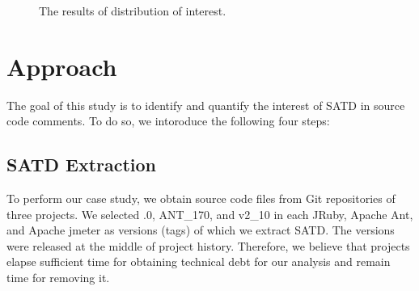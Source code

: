 \begin{figure}[!t]
  \begin{center}

  \caption{The results of distribution of interest.}
  \label{fig:dist}
  \end{center}
\end{figure}


\section{Approach} \label{sec:approach}
The goal of this study is to identify and quantify the interest of SATD in source code comments.
To do so, we intoroduce the following four steps:

\subsection{SATD Extraction}
To perform our case study, we obtain source code files from Git repositories of three projects. We selected {.0}, {\sc ANT\_170}, and {\sc v2\_10} in each JRuby, Apache Ant, and Apache jmeter as versions (tags) of which we extract SATD. The versions were released at the middle of project history. Therefore, we believe that projects elapse sufficient time for obtaining technical debt for our analysis and remain time for removing it.


